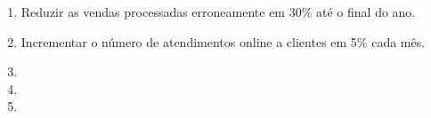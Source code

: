             \begin{enumerate}
             \item Reduzir as vendas processadas erroneamente em 30\% at\'{e} o final do ano.
             \item Incrementar o n\'{u}mero de atendimentos online a clientes em 5\% cada m\^{e}s.
             \item
             \item
             \item
           \end{enumerate}





